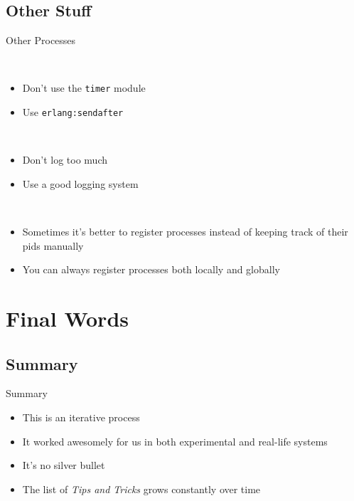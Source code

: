 \documentclass[utf8]{beamer}
\begin{document}
\subsection{Other Stuff}
\begin{frame}{Other Processes}
	\begin{description}
		\item<+->[Timers]\ \\
			\begin{itemize}
				\item Don't use the \texttt{timer} module
				\item Use \texttt{erlang:send\textunderscore after}
			\end{itemize}
		\item<+->[Logging]\ \\
			\begin{itemize}
				\item Don't log too much
				\item Use a good logging system
			\end{itemize}
		\item<+->[Registration]\ \\
			\begin{itemize}
				\item Sometimes it's better to register processes instead of keeping track of their pids manually
				\item You can always register processes \alert{both} locally and globally
			\end{itemize}
	\end{description}
\end{frame}

\section{Final Words}
\subsection{Summary}
\begin{frame}{Summary}
	\begin{itemize}
		\item<+-> This is an \alert{iterative} process
		\item<+-> It worked awesomely for us in both experimental and real-life systems
		\item<+-> It's no \alert{silver bullet}
		\item<+-> The list of \emph{Tips and Tricks} grows \alert{constantly} over time
	\end{itemize}
\end{frame}
\end{document}
